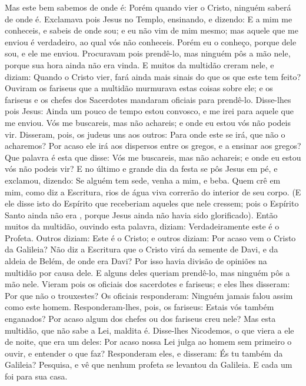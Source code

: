 {  Mas este bem sabemos de onde é: Porém quando vier o Cristo, ninguém saberá de onde é.
  Exclamava pois Jesus no Templo, ensinando, e dizendo: E a mim me conheceis, e sabeis de onde sou; e eu não vim de mim mesmo; mas aquele que me enviou é verdadeiro, ao qual vós não conheceis.
  Porém eu o conheço, porque dele sou, e ele me enviou.
  Procuravam pois prendê-lo, mas ninguém pôs a mão nele, porque sua hora ainda não era vinda.
  E muitos da multidão creram nele, e diziam: Quando o Cristo vier, fará ainda mais sinais do que os que este tem feito?
  Ouviram os fariseus que a multidão murmurava estas coisas sobre ele; e os fariseus e os chefes dos Sacerdotes mandaram oficiais para prendê-lo.
  Disse-lhes pois Jesus: Ainda um pouco de tempo estou convosco, e
{} me irei para aquele que me enviou.
  Vós me buscareis, mas não
{} achareis; e onde eu estou vós não podeis vir.
  Disseram, pois, os judeus uns aos outros: Para onde este se irá, que não o acharemos? Por acaso ele irá aos dispersos entre os gregos, e a ensinar aos gregos?
  Que palavra é esta que disse: Vós me buscareis, mas não
{} achareis; e onde eu estou vós não podeis vir?
  E no último e grande dia da festa se pôs Jesus em pé, e exclamou, dizendo: Se alguém tem sede, venha a mim, e beba.
  Quem crê em mim, como diz a Escritura, rios de água viva correrão do interior de seu corpo.
  (E ele disse isto do Espírito que receberiam aqueles que nele cressem; pois o Espírito Santo ainda não era
{}, porque Jesus ainda não havia sido glorificado).
  Então muitos da multidão, ouvindo esta palavra, diziam: Verdadeiramente este é o Profeta.
  Outros diziam: Este é o Cristo; e outros diziam: Por acaso vem o Cristo da Galileia?
  Não diz a Escritura que o Cristo virá da semente de Davi, e da aldeia de Belém, de onde era Davi?
  Por isso havia divisão de opiniões na multidão por causa dele.
  E alguns deles queriam prendê-lo, mas ninguém pôs a mão nele.
  Vieram pois os oficiais dos sacerdotes e fariseus; e eles lhes disseram: Por que não o trouxestes?
  Os oficiais responderam: Ninguém jamais falou assim como este homem.
  Responderam-lhes, pois, os fariseus: Estais vós também enganados?
  Por acaso algum dos chefes ou dos fariseus creu nele?
  Mas esta multidão, que não sabe a Lei, maldita é.
  Disse-lhes Nicodemos, o que viera a ele de noite, que era um deles:
  Por acaso nossa Lei julga ao homem sem primeiro o ouvir, e entender o que faz?
  Responderam eles, e disseram: És tu também da Galileia? Pesquisa, e vê que nenhum profeta se levantou da Galileia.
  E cada um foi para sua casa.
\par }

